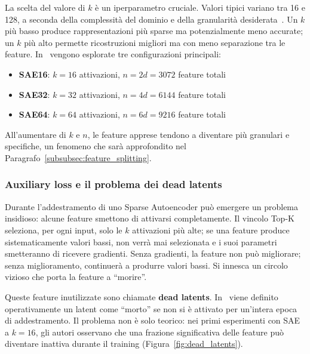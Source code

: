 La scelta del valore di $k$ è un iperparametro cruciale. Valori tipici variano tra 16 e 128, a seconda della complessità del dominio e della granularità desiderata~\parencite{oneill2024disentangling}. Un $k$ più basso produce rappresentazioni più sparse ma potenzialmente meno accurate; un $k$ più alto permette ricostruzioni migliori ma con meno separazione tra le feature. In~\parencite{oneill2024disentangling} vengono esplorate tre configurazioni principali:
\begin{itemize}
    \item \textbf{SAE16}: $k = 16$ attivazioni, $n = 2d = 3072$ feature totali
    \item \textbf{SAE32}: $k = 32$ attivazioni, $n = 4d = 6144$ feature totali
    \item \textbf{SAE64}: $k = 64$ attivazioni, $n = 6d = 9216$ feature totali
\end{itemize}
All'aumentare di $k$ e $n$, le feature apprese tendono a diventare più granulari e specifiche, un fenomeno che sarà approfondito nel Paragrafo~\ref{subsubsec:feature_splitting}.


\subsubsection{Auxiliary loss e il problema dei dead latents}
\label{subsubsec:auxiliary_loss}

Durante l'addestramento di uno Sparse Autoencoder può emergere un problema insidioso: alcune feature smettono di attivarsi completamente. Il vincolo Top-K seleziona, per ogni input, solo le $k$ attivazioni più alte; se una feature produce sistematicamente valori bassi, non verrà mai selezionata e i suoi parametri smetteranno di ricevere gradienti. Senza gradienti, la feature non può migliorare; senza miglioramento, continuerà a produrre valori bassi. Si innesca un circolo vizioso che porta la feature a ``morire''.

Queste feature inutilizzate sono chiamate \textbf{dead latents}. In~\parencite{oneill2024disentangling} viene definito operativamente un latent come ``morto'' se non si è attivato per un'intera epoca di addestramento. Il problema non è solo teorico: nei primi esperimenti con SAE a $k=16$, gli autori osservano che una frazione significativa delle feature può diventare inattiva durante il training (Figura~\ref{fig:dead_latents}).

